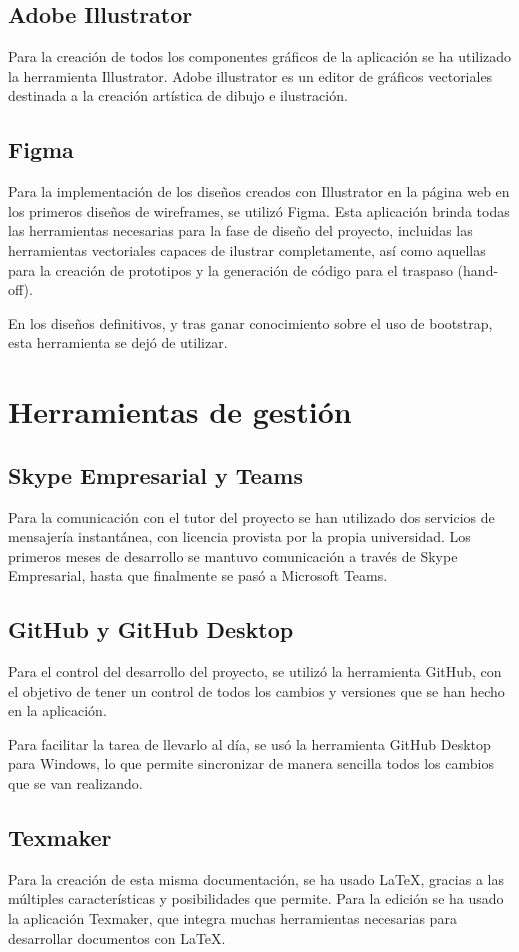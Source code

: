 \subsection{Adobe Illustrator}
Para la creación de todos los componentes gráficos de la aplicación se ha utilizado la herramienta Illustrator. Adobe illustrator es un editor de gráficos vectoriales destinada a la creación artística de dibujo e ilustración.

\subsection{Figma}
Para la implementación de los diseños creados con Illustrator en la página web en los primeros diseños de wireframes, se utilizó Figma. Esta aplicación brinda todas las herramientas necesarias para la fase de diseño del proyecto, incluidas las herramientas vectoriales capaces de ilustrar completamente, así como aquellas para la creación de prototipos y la generación de código para el traspaso (hand-off). 

En los diseños definitivos, y tras ganar conocimiento sobre el uso de bootstrap, esta herramienta se dejó de utilizar.

\section{Herramientas de gestión}

\subsection{Skype Empresarial y Teams}

Para la comunicación con el tutor del proyecto se han utilizado dos servicios de mensajería instantánea, con licencia provista por la propia universidad. Los primeros meses de desarrollo se mantuvo comunicación a través de Skype Empresarial, hasta que finalmente se pasó a Microsoft Teams.

\subsection{GitHub y GitHub Desktop}

Para el control del desarrollo del proyecto, se utilizó la herramienta GitHub, con el objetivo de tener un control de todos los cambios y versiones que se han hecho en la aplicación. 

Para facilitar la tarea de llevarlo al día, se usó la herramienta GitHub Desktop para Windows, lo que permite sincronizar de manera sencilla todos los cambios que se van realizando.

\subsection{Texmaker}

Para la creación de esta misma documentación, se ha usado LaTeX, gracias a las múltiples características y posibilidades que permite. Para la edición se ha usado la aplicación Texmaker, que integra muchas herramientas necesarias para desarrollar documentos con LaTeX.
